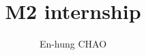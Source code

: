 \documentclass[11pt, oneside]{report}   	%
\title{M2 internship}
\author{En-hung CHAO}
\theoremstyle{remark}
\begin{document}
\let\clearpage\relax



\tableofcontents








%
%
%
%
%
%



%



\end{document}
